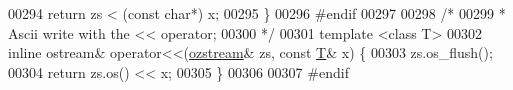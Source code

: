 \begin{DoxyCode}
00294     \textcolor{keywordflow}{return} zs < (\textcolor{keyword}{const} \textcolor{keywordtype}{char}*) x;
00295 \}
00296 \textcolor{preprocessor}{#endif}
00297 
00298 \textcolor{comment}{/*}
00299 \textcolor{comment}{ * Ascii write with the << operator;}
00300 \textcolor{comment}{ */}
00301 \textcolor{keyword}{template} <\textcolor{keyword}{class} T>
00302 \textcolor{keyword}{inline} ostream& operator<<(\hyperlink{classozstream}{ozstream}& zs, \textcolor{keyword}{const} \hyperlink{group___sparse_core___module_class_eigen_1_1_triplet}{T}& x) \{
00303     zs.os\_flush();
00304     \textcolor{keywordflow}{return} zs.os() << x;
00305 \}
00306 
00307 \textcolor{preprocessor}{#endif}
\end{DoxyCode}
